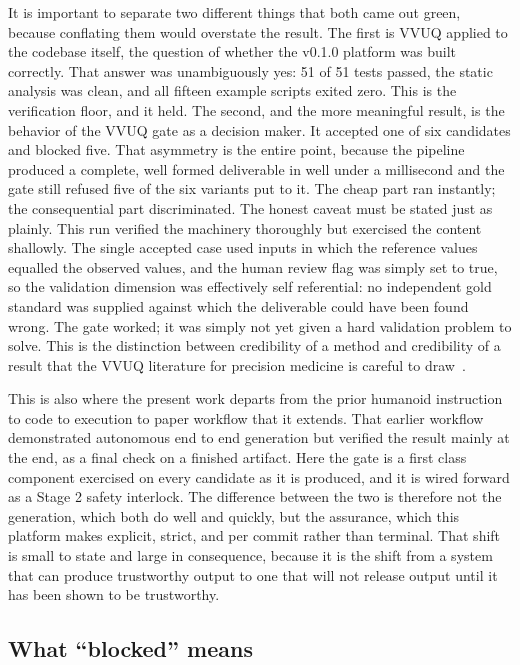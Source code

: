 It is important to separate two different things that both came out green, because
conflating them would overstate the result. The first is VVUQ applied to the
codebase itself, the question of whether the v0.1.0 platform was built correctly.
That answer was unambiguously yes: 51 of 51 tests passed, the static analysis was
clean, and all fifteen example scripts exited zero. This is the verification
floor, and it held. The second, and the more meaningful result, is the behavior
of the VVUQ gate as a decision maker. It accepted one of six candidates and
blocked five. That asymmetry is the entire point, because the pipeline produced a
complete, well formed deliverable in well under a millisecond and the gate still
refused five of the six variants put to it. The cheap part ran instantly; the
consequential part discriminated. The honest caveat must be stated just as
plainly. This run verified the machinery thoroughly but exercised the content
shallowly. The single accepted case used inputs in which the reference values
equalled the observed values, and the human review flag was simply set to true,
so the validation dimension was effectively self referential: no independent gold
standard was supplied against which the deliverable could have been found wrong.
The gate worked; it was simply not yet given a hard validation problem to solve.
This is the distinction between credibility of a method and credibility of a
result that the VVUQ literature for precision medicine is careful to
draw~\cite{sel2025vvuq}.

This is also where the present work departs from the prior humanoid instruction
to code to execution to paper workflow that it extends. That earlier workflow
demonstrated autonomous end to end generation but verified the result mainly at
the end, as a final check on a finished artifact. Here the gate is a first class
component exercised on every candidate as it is produced, and it is wired forward
as a Stage 2 safety interlock. The difference between the two is therefore not
the generation, which both do well and quickly, but the assurance, which this
platform makes explicit, strict, and per commit rather than terminal. That shift
is small to state and large in consequence, because it is the shift from a system
that can produce trustworthy output to one that will not release output until it
has been shown to be trustworthy.

\subsection{What ``blocked'' means}

